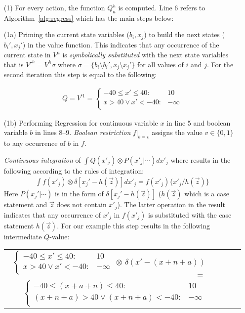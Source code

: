\begin{itemize}
\item[(1)] For every action, the function $Q^h_a$ is computed. Line 6 refers to Algorithm~\ref{alg:regress} which has the main steps below:

(1a) Priming the current state variables ($b_i,x_j$) to build the next states ($b_i',x_j'$) in the value function. This indicates that any occurrence of the current state in $V^h$ is \emph{symbolically substituted} with the next state variables that is $V'^h= V^h \sigma$ where $\sigma = \lbrace b_i \setminus b_i' , x_j \setminus x_j' \rbrace$ for all values of $i$ and $j$. For the second iteration this step is equal to the following: 

\begin{align}
Q = V^{'1} =  
\begin{cases}
  -40 \leq x' \leq 40: & 10 \\ 
 x>40 \lor x'<-40 : & -\infty \\ 
\end{cases} \nonumber
\end{align}

(1b) Performing Regression for continuous variable $x$ in line 5 and boolean variable $b$ in lines 8--9. \emph{Boolean restriction} $f|_{b=v}$ assigns the value $v \in \{ 0,1 \}$ to any occurrence of $b$ in $f$. 

\emph{Continuous integration} of $\int Q(x'_j) \otimes P(x'_j|\cdots) dx'_j$ where results in the following according to the rules of integration: 
\begin{align}
\int f(x'_j) \otimes \delta[x_j' - h(\vec{z})] dx'_j = f(x'_j) \{ x'_j / h(\vec{z}) \}\nonumber
\end{align}
 Here $P(x_j'|\cdots)$ is in the form of $\delta[x_j' - h(\vec{z})]$ ($h(\vec{z})$ which is a case statement and $\vec{z}$ does not contain $x'_j$). The latter operation in the result indicates that any occurrence of $x'_j$ in $f(x'_j)$ is substituted with the case statement $h(\vec{z})$. For our example this step results in the following intermediate $Q$-value: 
{\footnotesize 
\begin{center}
\begin{tabular}{r c c c l}
\hspace{-6mm} 
$
\begin{cases}
  -40 \leq x' \leq 40: & 10 \\ 
 x>40 \lor x'<-40 : & -\infty \\ 
\end{cases} $
$\otimes$
$ \delta \left( x' - (x+n+a) \right) $
$ = $
\\
  $\begin{cases}
  -40 \leq (x+a+n) \leq 40: & 10 \\ 
 (x+n+a)>40 \lor (x+n+a)<-40 : & -\infty \\ 
  \end{cases}$
\end{tabular}
\end{center}
}
\normalsize


\end{itemize}
